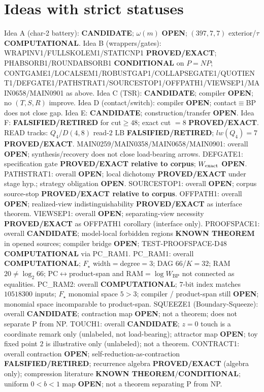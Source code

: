 \documentclass[11pt]{article}
\begin{document}
\section*{Ideas with strict statuses}
Idea A (char-2 battery): \textbf{CANDIDATE}; $\omega(m)$ \textbf{OPEN}; $(397,7,7)$ exterior/$\tau$ \textbf{COMPUTATIONAL}.
Idea B (wrappers/gates): WRAPINV1/FULLSKOLEM1/STATICNP1 \textbf{PROVED/EXACT};
PHABSORB1/ROUNDABSORB1 \textbf{CONDITIONAL} on $P=NP$;
CONTGAME1/LOCALSEM1/ROBUSTGAP1/COLLAPSEGATE1/QUOTIENT1/DEFGATE1/PATHSTRAT1/SOURCESTOP1/OFFPATH1/VIEWSEP1/MAIN0658/MAIN0901 as above.
Idea C (TSR): \textbf{CANDIDATE}; compiler \textbf{OPEN}; no $(T,S,R)$ improve.
Idea D (contact/switch): compiler \textbf{OPEN}; contact$\equiv$BP does not close gap.
Idea E: \textbf{CANDIDATE}; construction/transfer \textbf{OPEN}.
Idea F: \textbf{FALSIFIED/RETIRED} for cut$\ge48$; exact cut $=8$ \textbf{PROVED/EXACT}.
READ tracks: $Q_4$/$D(4,8)$ read-$2$ LB \textbf{FALSIFIED/RETIRED}; $lw(Q_4)=7$ \textbf{PROVED/EXACT}.
MAIN0259/MAIN0358/MAIN0658/MAIN0901: overall \textbf{OPEN}; synthesis/recovery does not close load-bearing arrows.
DEFGATE1: specification gate \textbf{PROVED/EXACT relative to corpus}; $W_{\rm exact}$ \textbf{OPEN}.
PATHSTRAT1: overall \textbf{OPEN}; local dichotomy \textbf{PROVED/EXACT} under stage hyp.; strategy obligation \textbf{OPEN}.
SOURCESTOP1: overall \textbf{OPEN}; corpus source-stop \textbf{PROVED/EXACT relative to corpus}.
OFFPATH1: overall \textbf{OPEN}; realized-view indistinguishability \textbf{PROVED/EXACT} as interface theorem.
VIEWSEP1: overall \textbf{OPEN}; separating-view necessity \textbf{PROVED/EXACT} as OFFPATH1 corollary (interface only).
PROOFSPACE1: overall \textbf{CANDIDATE}; model-local forbidden regions \textbf{KNOWN THEOREM} in opened sources;
compiler bridge \textbf{OPEN}; TEST-PROOFSPACE-D48 \textbf{COMPUTATIONAL} via PC\_RAM1.
PC\_RAM1: overall \textbf{COMPUTATIONAL}; $F_\star$ width$=$degree$=3$; DAG $66$/$K{=}32$; RAM $20\neq\log_2 66$;
PC$\leftrightarrow$product-span and RAM$=\log W_{\mathrm{BP}}$ not connected as equalities.
PC\_RAM2: overall \textbf{COMPUTATIONAL}; $7$-bit index matches $10518300$ inputs; $F_\star$ monomial space $5{>}3$;
compiler / product-span still \textbf{OPEN}; monomial space incomparable to product-span.
SQUEEZE1 (Boundary-Squeeze): overall \textbf{CANDIDATE}; contraction map \textbf{OPEN}; not a theorem;
does not separate P from NP.
TOUCH1: overall \textbf{CANDIDATE}; $z{=}0$ touch is a coordinate remark only (unlabeled, not load-bearing); attractor map \textbf{OPEN}; toy fixed point $2$ is illustrative only (unlabeled); not a theorem.
CONTRACT1: overall contraction \textbf{OPEN}; self-reduction-as-contraction \textbf{FALSIFIED/RETIRED};
recurrence algebra \textbf{PROVED/EXACT} (algebra only); compression literature \textbf{KNOWN THEOREM}/\textbf{CONDITIONAL};
uniform $0{<}b{<}1$ map \textbf{OPEN}; not a theorem separating P from NP.
\end{document}
